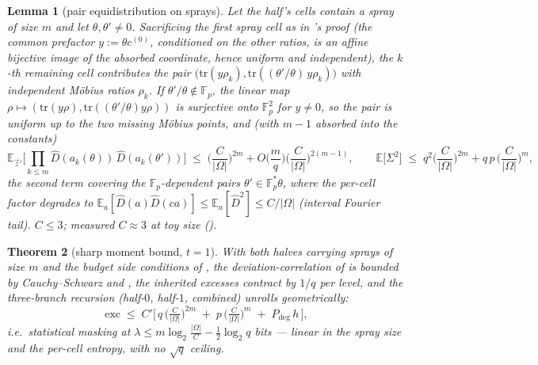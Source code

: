 \documentclass{article}
\newcommand{\Fp}{\mathbb{F}_p}
\newtheorem{theorem}{Theorem}[section]
\newtheorem{lemma}[theorem]{Lemma}
\theoremstyle{definition}
\begin{document}
\begin{lemma}[pair equidistribution on sprays]\label{lem:pairs}
Let the half's cells contain a spray of size $m$ and let $\theta, \theta' \neq 0$. Sacrificing the first spray cell as in 's proof (the common prefactor $y := \theta c^{(0)}$, conditioned on the other ratios, is an affine bijective image of the absorbed coordinate, hence uniform and independent), the $k$-th remaining cell contributes the pair $\big(\mathrm{tr}(y\rho_k), \mathrm{tr}((\theta'/\theta)\, y\rho_k)\big)$ with independent M\"obius ratios $\rho_k$. If $\theta'/\theta \notin \Fp$, the linear map $\rho \mapsto (\mathrm{tr}(y\rho), \mathrm{tr}((\theta'/\theta)y\rho))$ is surjective onto $\Fp^2$ for $y \neq 0$, so the pair is uniform up to the two missing M\"obius points, and (with $m-1$ absorbed into the constants)
\[
\mathbb{E}_{\vec z'}\Big[\prod_{k \leq m} \hat D(a_k(\theta))\, \hat D(a_k(\theta'))\Big] \;\leq\; \Big(\frac{C}{|\Omega|}\Big)^{2m} + O\!\Big(\frac{m}{q}\Big)\Big(\frac{C}{|\Omega|}\Big)^{2(m-1)} , \qquad
\mathbb{E}\big[\Sigma^2\big] \;\leq\; q^2 \Big(\frac{C}{|\Omega|}\Big)^{2m} + q\,p\,\Big(\frac{C}{|\Omega|}\Big)^{m} ,
\]
the second term covering the $\Fp$-dependent pairs $\theta' \in \Fp^* \theta$, where the per-cell factor degrades to $\mathbb{E}_a[\hat D(a)\hat D(ca)] \leq \mathbb{E}_a[\hat D^2] \leq C/|\Omega|$ (interval Fourier tail). $C \leq 3$; measured $C \approx 3$ at toy size ().
\end{lemma}

\begin{theorem}[sharp moment bound, $t = 1$]\label{thm:sharp}
With both halves carrying sprays of size $m$ and the budget side conditions of , the deviation-correlation of  is bounded by Cauchy--Schwarz and , the inherited excesses contract by $1/q$ per level, and the three-branch recursion (half-$0$, half-$1$, combined) unrolls geometrically:
\[
\mathrm{exc} \;\leq\; C'\Big[\, q\,\big(\tfrac{C}{|\Omega|}\big)^{2m} \;+\; p\,\big(\tfrac{C}{|\Omega|}\big)^{m} \;+\; P_{\mathrm{deg}}\, h \,\Big] ,
\]
i.e.\ statistical masking at $\lambda \leq m \log_2\frac{|\Omega|}{C} - \tfrac12\log_2 q$ bits --- \emph{linear} in the spray size and the per-cell entropy, with no $\sqrt{q}$ ceiling.
\end{theorem}
\end{document}
